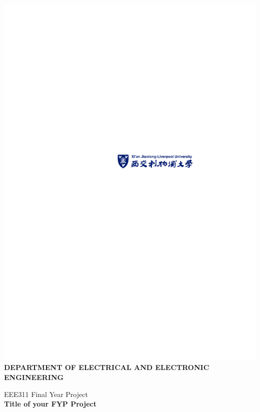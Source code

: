 \documentclass[12pt,a4paper]{report}
\begin{document}
\begin{titlepage}
\begin{center}
\includegraphics[scale=1.5]{CoverSheet}\\
\bf{ DEPARTMENT OF ELECTRICAL AND ELECTRONIC ENGINEERING }
\end{center}

\vspace{18mm}
 \begin{center}
 \begin{Large}
 {EEE311 Final Year Project}\\ 
 \vspace{2.0cm}
 \bf{Title of your FYP Project}
 \end{Large}
 \end{center} 
\vspace{2.0cm}


\end{titlepage}
\end{document}
